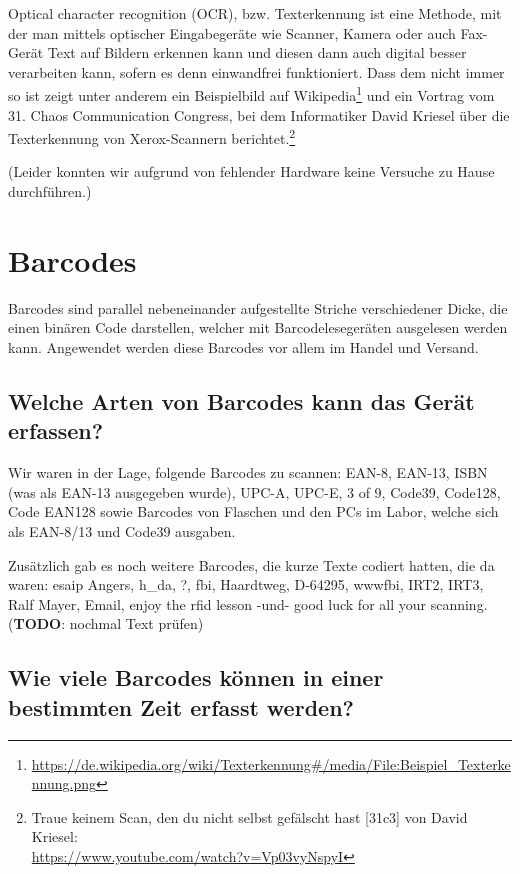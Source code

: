 \documentclass[a4paper,11pt,headsepline,footsepline,parskip=half]{scrartcl}
\begin{document}
\begin{titlepage}
Optical character recognition (OCR), bzw. Texterkennung ist eine Methode, mit der man mittels optischer
Eingabegeräte wie Scanner, Kamera oder auch Fax-Gerät Text auf Bildern erkennen kann und diesen dann auch
digital besser verarbeiten kann, sofern es denn einwandfrei funktioniert. Dass dem nicht immer so ist zeigt
unter anderem ein Beispielbild auf Wikipedia\footnote{\url{https://de.wikipedia.org/wiki/Texterkennung\#/media/File:Beispiel_Texterkennung.png}}
und ein Vortrag vom 31. Chaos Communication Congress, bei dem Informatiker David Kriesel über die Texterkennung
von Xerox-Scannern berichtet.\footnote{Traue keinem Scan, den du nicht selbst gefälscht hast [31c3] von David Kriesel:\\ \url{https://www.youtube.com/watch?v=Vp03vyNspyI}}

(Leider konnten wir aufgrund von fehlender Hardware keine Versuche zu Hause durchführen.)

\end{titlepage}

\section{Barcodes}

Barcodes sind parallel nebeneinander aufgestellte Striche verschiedener Dicke, die einen binären Code darstellen,
welcher mit Barcodelesegeräten ausgelesen werden kann. Angewendet werden diese Barcodes vor allem im Handel und Versand.

\subsection{Welche Arten von Barcodes kann das Gerät erfassen?}

Wir waren in der Lage, folgende Barcodes zu scannen: EAN-8, EAN-13, ISBN (was als EAN-13 ausgegeben wurde),
UPC-A, UPC-E, 3 of 9, Code39, Code128, Code EAN128 sowie Barcodes von Flaschen und den PCs im Labor, welche
sich als EAN-8/13 und Code39 ausgaben.

Zusätzlich gab es noch weitere Barcodes, die kurze Texte codiert hatten, die da waren: esaip Angers, h\_da, ?, fbi, Haardtweg, D-64295,
wwwfbi, IRT2, IRT3, Ralf Mayer, Email, enjoy the rfid lesson -und- good luck for all your scanning. (\textbf{TODO}: nochmal Text prüfen)

\subsection{Wie viele Barcodes können in einer bestimmten Zeit erfasst werden?}
\end{document}
